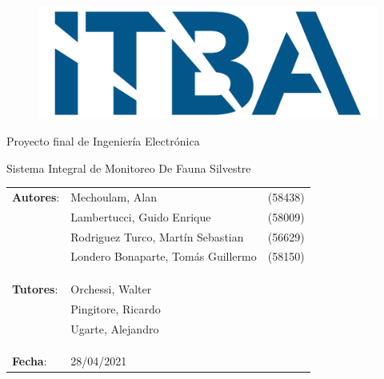 \begin{titlepage}
\begin{figure}[H]
	\centering
	\includegraphics[width=0.5\linewidth]{./Utils/ITBA_2}
\end{figure}

\vspace*{1.5cm}

\center
{\Huge Proyecto final de Ingeniería Electrónica }

\vspace*{1cm}

{\LARGE \textcolor{PName}{Sistema Integral de Monitoreo De Fauna Silvestre} }

\vspace*{3cm}

\begin{tabular}{llr} 	
\textbf{Autores}: & Mechoulam, Alan  &  (58438)\\
 & Lambertucci, Guido Enrique  & (58009) \\
 & Rodriguez Turco, Martín Sebastian  & (56629) \\
 & Londero Bonaparte, Tomás Guillermo  & (58150) \\
 &  & \\
 &  & \\
 &  & \\
\textbf{Tutores}: & Orchessi, Walter & \hspace*{4cm} \\
 & Pingitore, Ricardo & \hspace*{4cm} \\
 & Ugarte, Alejandro & \hspace*{4cm} \\
 &  & \\
 &  & \\
 &  & \\
\textbf{Fecha}: & 28/04/2021 & \hspace*{4.5cm}\\
\end{tabular}

\end{titlepage}